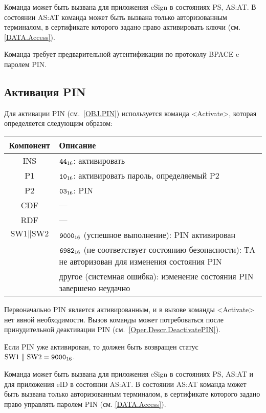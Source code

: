 Команда может быть вызвана для приложения eSign в состояниях PS, AS:AT.
В состоянии AS:AT команда может быть вызвана только
авторизованным терминалом, в сертификате которого задано право
активировать ключи (см. \ref{DATA.Access}).

Команда требует предварительной аутентификации 
по протоколу BPACE c паролем PIN.

%

\subsection{Активация PIN}\label{Oper.Descr.ActivatePIN}

Для активации PIN (см.~\ref{OBJ.PIN})  используется
команда <Activate>, которая определяется следующим образом:

\noindent
\begin{tabular}{|c|p{14cm}|}
\hline
Компонент & Описание\\
\hline
\hline
INS & $\texttt{44}_{16}$: активировать\\
\hline
P1 & $\texttt{10}_{16}$: активировать пароль, определяемый P2\\
\hline
P2 & $\texttt{03}_{16}$: PIN \\
\hline
CDF &  --- \\
\hline \hline
RDF &  --- \\
\hline
$\text{SW1} \parallel \text{SW2}$ & 
$\texttt{9000}_{16}$ (успешное выполнение): PIN активирован\\
 & $\texttt{6982}_{16}$ (не соответствует состоянию безопасности): ТA не 
авторизован для изменения состояния PIN\\
 & другое (системная ошибка): изменение состояния PIN завершено 
неудачно\\
\hline
\end{tabular}

Первоначально PIN является активированным, и в вызове команды <Activate> 
нет явной необходимости. Вызов команды может потребоваться после 
принудительной деактивации PIN (см.~\ref{Oper.Descr.DeactivatePIN}). 

Если PIN уже активирован, то должен быть возвращен 
статус $\text{SW1} \parallel \text{SW2} = \texttt{9000}_{16}$.

Команда может быть вызвана для приложения eSign 
в состояниях PS, AS:AT и для приложения eID в состоянии AS:AT. 
В состоянии AS:AT команда может быть вызвана 
только авторизованным терминалом, в сертификате которого задано право
управлять паролем PIN (см. \ref{DATA.Access}).

